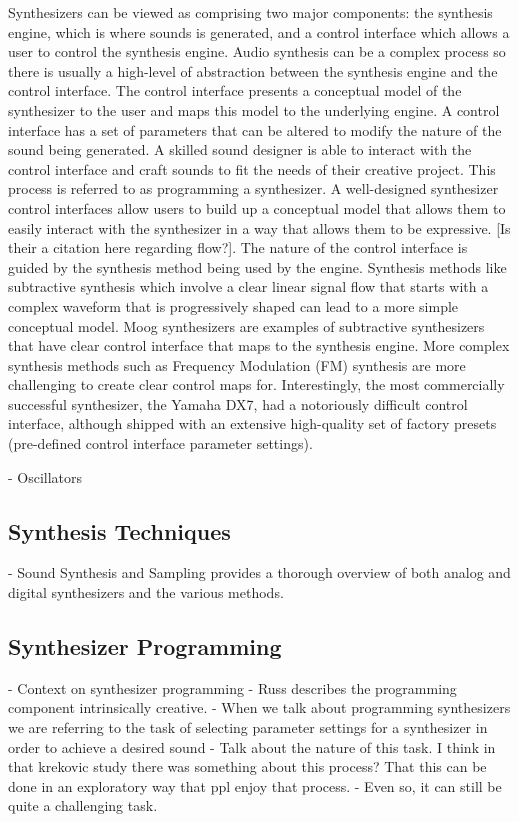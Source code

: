 Synthesizers can be viewed as comprising two major components: the synthesis engine, which is where sounds is generated, and a control interface which allows a user to control the synthesis engine. Audio synthesis can be a complex process so there is usually a high-level of abstraction between the synthesis engine and the control interface. The control interface presents a conceptual model of the synthesizer to the user and maps this model to the underlying engine. A control interface has a set of parameters that can be altered to modify the nature of the sound being generated. A skilled sound designer is able to interact with the control interface and craft sounds to fit the needs of their creative project. This process is referred to as programming a synthesizer. A well-designed synthesizer control interfaces allow users to build up a conceptual model that allows them to easily interact with the synthesizer in a way that allows them to be expressive. [Is their a citation here regarding flow?]. The nature of the control interface is guided by the synthesis method being used by the engine. Synthesis methods like subtractive synthesis which involve a clear linear signal flow that starts with a complex waveform that is progressively shaped can lead to a more simple conceptual model. Moog synthesizers are examples of subtractive synthesizers that have clear control interface that maps to the synthesis engine. More complex synthesis methods such as Frequency Modulation (FM) synthesis are more challenging to create clear control maps for. Interestingly, the most commercially successful synthesizer, the Yamaha DX7, had a notoriously difficult control interface, although shipped with an extensive high-quality set of factory presets (pre-defined control interface parameter settings).

- Oscillators

\subsection{Synthesis Techniques}
- Sound Synthesis and Sampling provides a thorough overview of both analog and digital synthesizers and the various methods. \cite{russ2012sound}

\subsection{Synthesizer Programming}
- Context on synthesizer programming \cite{jenkins2019analog}
- Russ describes the programming component intrinsically creative.
- When we talk about programming synthesizers we are referring to the task of selecting parameter settings for a synthesizer in order to achieve a desired sound
- Talk about the nature of this task. I think in that krekovic study there was something about this process? That this can be done in an exploratory way that ppl enjoy that process.
- Even so, it can still be quite a challenging task.

